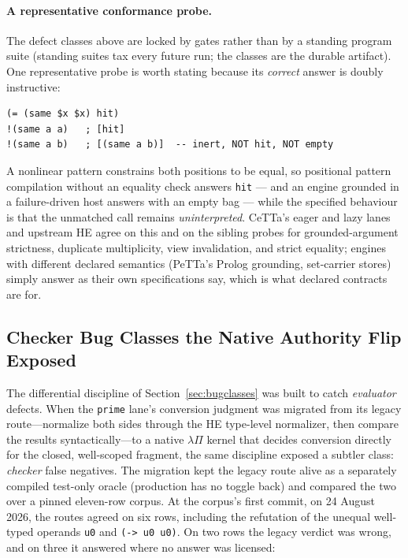\documentclass[11pt]{article}
\newcommand{\code}[1]{\texttt{#1}}
\newcommand{\PeTTa}{\textup{PeTTa}}
\newcommand{\HE}{\textup{HE}}
\newcommand{\CeTTa}{\textup{CeTTa}}
\begin{document}
\paragraph{A representative conformance probe.}
The defect classes above are locked by gates rather than by a standing
program suite (standing suites tax every future run; the classes are
the durable artifact).  One representative probe is worth stating
because its \emph{correct} answer is doubly instructive:

\begin{verbatim}
(= (same $x $x) hit)
!(same a a)   ; [hit]
!(same a b)   ; [(same a b)]  -- inert, NOT hit, NOT empty
\end{verbatim}

\noindent
A nonlinear pattern constrains both positions to be equal, so
positional pattern compilation without an equality check answers
\code{hit} --- and an engine grounded in a failure-driven host answers
with an empty bag --- while the specified behaviour is that the
unmatched call remains \emph{uninterpreted}.  \CeTTa{}'s eager and lazy
lanes and upstream \HE{} agree on this and on the sibling probes for
grounded-argument strictness, duplicate multiplicity, view
invalidation, and strict equality; engines with different declared
semantics (\PeTTa{}'s Prolog grounding, set-carrier stores) simply
answer as their own specifications say, which is what declared
contracts are for.

\subsection{Checker Bug Classes the Native Authority Flip Exposed}
\label{sec:checkerbugs}

The differential discipline of Section~\ref{sec:bugclasses} was built to
catch \emph{evaluator} defects.  When the \code{prime} lane's conversion
judgment was migrated from its legacy route---normalize both sides
through the \HE{} type-level normalizer, then compare the results
syntactically---to a native $\lambda\Pi$ kernel that decides conversion
directly for the closed, well-scoped fragment, the same discipline exposed
a subtler class: \emph{checker} false negatives.  The migration kept the
legacy route alive as a separately compiled test-only oracle (production
has no toggle back) and compared the two over a pinned eleven-row corpus.
At the corpus's first commit, on 24 August 2026, the routes agreed on six
rows, including the refutation of the unequal well-typed operands
\code{u0} and \code{(-> u0 u0)}.  On two rows the legacy verdict was wrong,
and on three it answered where no answer was licensed:
\end{document}
